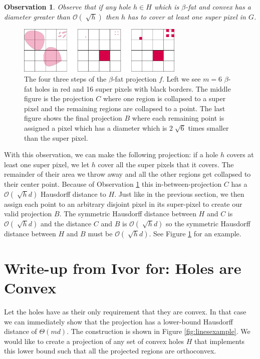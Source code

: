\documentclass{paper}
\newtheorem{observation}{Observation}
\begin{document}
{\begin{observation}
\label{obs:covering}
Observe that if any hole $h \in H$ which is $\beta$-fat and convex has a diameter greater than $\mathcal{O}(\sqrt[]{h})$ then $h$ has to cover at least one super pixel in $G$. 
\end{observation}

\begin{figure}[H]
\centering
\includegraphics[width=300px]{Figures/fatprojection.png}
\caption{The four three steps of the $\beta$-fat projection $f$. Left we see $m=6$ $\beta$-fat holes in red and 16 super pixels with black borders. The middle figure is the projection $C$ where one region is collapsed to a super pixel and the remaining regions are collapsed to a point. The last figure shows the final projection $B$ where each remaining point is assigned a pixel which has a diameter which is $2\sqrt[]{6}$ times smaller than the super pixel. }
\label{fig:fatprojection}
\end{figure}


With this observation, we can make the following projection: if a hole $h$ covers at least one super pixel, we let $h$ cover all the super pixels that it covers. The remainder of their area we throw away and all the other regions get collapsed to their center point. Because of Observation \ref{obs:covering} this in-between-projection $C$ has a $\mathcal{O}(\sqrt[]{h}d)$ Hausdorff distance to $H$.
Just like in the previous section, we then assign each point to an arbitrary disjoint pixel in its super-pixel to create our valid projection $B$. The symmetric Hausdorff distance between $H$ and $C$ is $\mathcal{O}(\sqrt[]{h}d)$ and the distance $C$ and $B$ is $\mathcal{O}(\sqrt[]{h}d)$ so the symmetric Hausdorff distance between $H$ and $B$ must be $\mathcal{O}(\sqrt[]{h}d)$. See Figure \ref{fig:fatprojection} for an example.



\section{Write-up from Ivor for: Holes are Convex}



Let the holes have as their only requirement that they are convex. In that case we can immediately show that the projection has a lower-bound Hausdorff distance of $\Theta(md)$. The construction is shown in Figure \ref{fig:linesexample}. We would like to create a projection of any set of convex holes $H$ that implements this lower bound such that all the projected regions are orthoconvex.


}
\end{document}
